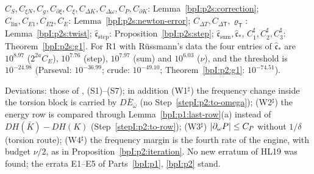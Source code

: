 \begin{remark}\label{bpI:p2s:register}
$C_S,C_{\xi N},C_g,C_{\partial\xi},C_\xi,C_{\Delta K},C_{\Delta\omega},C_P,C_{\partial K}$: Lemma~\ref{bpI:p2s:correction}; $C_{\mathrm{lin}},C_{E1},C_{E2},C_E$:
Lemma~\ref{bpI:p2s:newton-error}; $C_{\Delta T},C_{\Delta\mathsf T},\varrho_{\mathsf T}$: Lemma~\ref{bpI:p2s:twist}; $\hat{\mathfrak c}_{\mathrm{step}}$:
Proposition~\ref{bpI:p2s:step}; $\hat{\mathfrak c}_{\mathrm{sum}},\hat{\mathfrak c}_*$, $C_1^\sharp,C_2^\sharp,C_3^\sharp$: Theorem~\ref{bpI:p2s:g1}. For R1 with R\"ussmann's data the
four entries of $\hat{\mathfrak c}_*$ are $10^{8.97}$ ($2^{2a}C_E$), $10^{7.76}$ (step), $10^{7.97}$ (sum) and $10^{6.03}$ ($\nu$), and the threshold is
$10^{-24.98}$ (Parseval: $10^{-36.99}$; crude: $10^{-49.10}$; Theorem~\ref{bpI:p2:g1}: $10^{-74.51}$).

Deviations: those of , (S1)--(S7); in addition (W1$^\sharp$) the frequency change inside the torsion block is carried by
$D\bar E_{\bar\omega}$ (no Step~\ref{stepI:p2:to-omega}); (W2$^\sharp$) the energy row is compared through Lemma~\ref{bpI:p1:last-row}(a) instead of
$DH(\bar K)-DH(K)$ (Step~\ref{stepI:p2:to-row}); (W3$^\sharp$) $\lvert \partial_\omega P\rvert\le C_P$ without $1/\delta$ (torsion route); (W4$^\sharp$) the frequency
margin is the fourth rate of the engine, with budget $\nu/2$, as in Proposition~\ref{bpI:p2:iteration}. No new erratum of HL19 was found; the
errata E1--E5 of Parts~\ref{bpI:p1}, \ref{bpI:p2} stand.
\end{remark}
